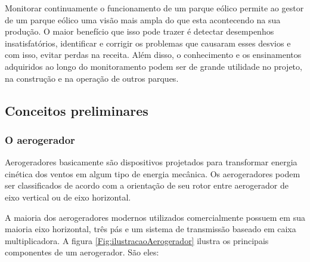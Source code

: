 Monitorar continuamente o funcionamento de um parque eólico permite ao gestor de um parque eólico uma visão mais ampla do que esta acontecendo na sua produção. O maior benefício que isso pode trazer é detectar desempenhos insatisfatórios, identificar e corrigir os problemas que causaram esses desvios e com isso, evitar perdas na receita. Além disso, o conhecimento e os ensinamentos adquiridos ao longo do monitoramento podem ser de grande utilidade no projeto, na construção e na operação de outros parques.


\subsection{Conceitos preliminares}
\label{Sec:conceitosPreliminares}

\subsubsection{O aerogerador}
\label{Sec:oAerogerador}

Aerogeradores basicamente são dispositivos projetados para transformar energia cinética dos ventos em algum tipo de energia mecânica. Os aerogeradores podem ser classificados de acordo com a orientação de seu rotor entre aerogerador de eixo vertical ou de eixo horizontal.

A maioria dos aerogeradores modernos utilizados comercialmente possuem em sua maioria eixo horizontal, três pás e um sistema de transmissão baseado em caixa multiplicadora. A figura \ref{Fig:ilustracaoAerogerador} ilustra os principais componentes de um aerogerador. São eles:

